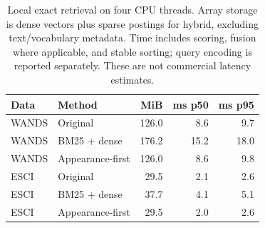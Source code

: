 \begin{table}[t]
\caption{Local exact retrieval on four CPU threads. Array storage is dense vectors plus sparse postings for hybrid, excluding text/vocabulary metadata. Time includes scoring, fusion where applicable, and stable sorting; query encoding is reported separately. These are not commercial latency estimates.}
\label{tab:cost}
\centering\small
\begin{tabular}{llrrr}\toprule
Data & Method & MiB & ms p50 & ms p95\\\midrule
WANDS & Original & 126.0 & 8.6 & 9.7\\
WANDS & BM25 + dense & 176.2 & 15.2 & 18.0\\
WANDS & Appearance-first & 126.0 & 8.6 & 9.8\\
ESCI & Original & 29.5 & 2.1 & 2.6\\
ESCI & BM25 + dense & 37.7 & 4.1 & 5.1\\
ESCI & Appearance-first & 29.5 & 2.0 & 2.6\\
\bottomrule\end{tabular}
\end{table}
